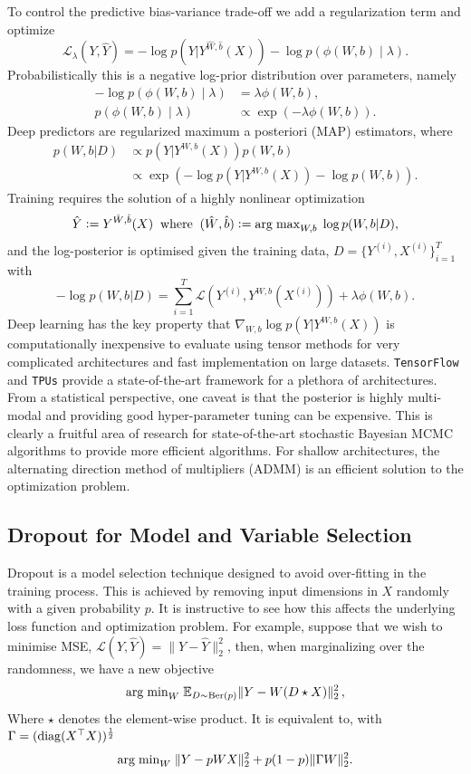 \documentclass[12pt]{article}
\newcommand{\defeq}{\mathrel{\mathop:}=}
\begin{document}
To control the predictive bias-variance trade-off we add a  regularization term and optimize
$$\mathcal{L}_{\lambda}(Y, \hat{Y} ) = - \log p( Y| Y^{ \hat{W} , \hat{b} } (X) )- \log p( \phi(W, b) \mid \lambda).$$
Probabilistically this is a negative log-prior distribution over parameters, namely
\begin{align*}
- \log p( \phi(W, b) \mid \lambda) & =  \lambda \phi(W,b),\\
p( \phi(W, b) \mid \lambda ) & \propto \exp ( - \lambda \phi(W,b)).
\end{align*}
Deep predictors are regularized maximum a posteriori (MAP) estimators, where
\begin{align*}
p( W, b | D ) & \propto  p( Y| Y^{W ,b } (X) ) p( W, b) \\
& \propto  \exp \left ( - \log p( Y| Y^{W ,b } (X) ) - \log p( W, b) \right ).
\end{align*}
Training requires the solution of a highly nonlinear optimization  
$$
\hat{Y} \defeq Y^{ \hat{W} , \hat{b} } (X) \; \; {\rm where} \; \; ( \hat{W} , \hat{b} ) \defeq 
{\rm arg \; max}_{W,b} \; \log p( W, b | D),
$$
and the log-posterior is optimised given the training data, $D = \{ Y^{(i)} , X^{(i)} \}_{i=1}^T$ with
\[ 
- \log p( W, b | D ) = \sum_{i=1}^T \mathcal{L}( Y^{(i)} , Y^{W,b} (X^{(i)} ) ) + \lambda \phi( W, b ).
\]
Deep learning has the key property that $ \nabla_{W,b}  \log p( Y| Y^{W ,b } (X) ) $ is computationally inexpensive to evaluate using tensor methods 
for very complicated architectures and fast implementation on large datasets. {\tt TensorFlow} and {\tt TPUs} provide a state-of-the-art framework for a plethora of architectures.
From a statistical perspective, one caveat is that the posterior is highly multi-modal and providing good hyper-parameter tuning can be expensive.
This is clearly a fruitful area of research for state-of-the-art stochastic Bayesian MCMC algorithms to provide more efficient algorithms.
For shallow architectures,  the alternating direction method of multipliers (ADMM) is an efficient solution to the optimization problem.

\subsection{Dropout for Model and Variable Selection}
Dropout is a model selection technique designed to avoid over-fitting in the training process. This is achieved by removing input dimensions in $X$ randomly with a given probability $p$. 
It is instructive to see how this affects the underlying loss function and optimization problem. For example, suppose that we wish to minimise MSE,  $\mathcal{L}(Y,\hat{Y})=\|Y-\hat{Y}\|^2_2$, then, when marginalizing over the randomness, we have a new objective
$$
{\rm arg \; min}_W \; \mathbb{E}_{ D \sim {\rm Ber} (p) } \Vert Y - W ( D \star X ) \Vert^2_2\,,
$$
Where $ \star$ denotes the element-wise product. It is equivalent to, with $ \Gamma = ( {\rm diag} ( X^\top X) )^{\frac{1}{2}} $
$$
{\rm arg \; min}_W \;  \Vert Y - p W X \Vert^2_2 + p(1-p) \Vert \Gamma W \Vert^2_2.
$$
\end{document}
